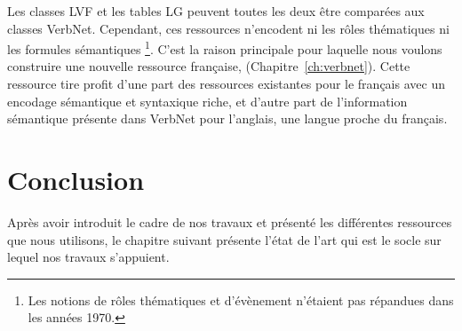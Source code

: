 

Les classes LVF et les tables LG peuvent toutes les deux être comparées aux
classes VerbNet. Cependant, ces ressources n'encodent ni les rôles thématiques
ni les formules sémantiques \footnote{Les notions de rôles thématiques et
d'évènement n'étaient pas répandues dans les années 1970.}.  C'est la raison
principale pour laquelle nous voulons construire une nouvelle ressource
française, \verbenet{} (Chapitre~\ref{ch:verbnet}). Cette ressource tire profit
d'une part des ressources existantes pour le français avec un encodage
sémantique et syntaxique riche, et d'autre part de l'information sémantique
présente dans VerbNet pour l'anglais, une langue proche du français.

\section*{Conclusion}

Après avoir introduit le cadre de nos travaux et présenté les différentes
ressources que nous utilisons, le chapitre suivant présente l'état de l'art qui
est le socle sur lequel nos travaux s'appuient.

